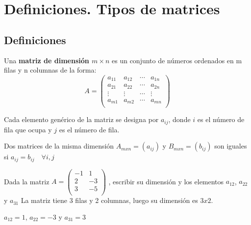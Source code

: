 \begin{indice}
\minitoc
\end{indice}

\newpage 

\section{Definiciones. Tipos de matrices}

\subsection{Definiciones}


\begin{definicion}
Una {\bf matriz de dimensión $m \times n$}  es un conjunto de números ordenados en m filas y n columnas de la forma:
 \[ A=\begin{pmatrix} 
 a_{11} & a_{12} & \cdots & a_{1n} \\
 a_{21} & a_{22} & \cdots & a_{2n} \\
  \vdots  & \vdots  & \cdots & \vdots \\
 a_{m1} & a_{m2} & \cdots & a_{mn} \\
\end{pmatrix}
\]
\end{definicion}

Cada elemento genérico de la matriz se designa por $a_{ij}$, donde $i$ es el número de fila que ocupa y $j$ es el número de fila.

\begin{definicion}[Igualdad]
Dos matrices de la misma dimensión $A_{mxn}=(a_{ij})$ y $B_{mxn}=(b_{ij})$ son iguales si $a_{ij}=b_{ij}\quad \forall i,j$
\end{definicion}

\begin{ejemplo}
Dada la matriz
$A= \begin{pmatrix}  -1 & 1  \\  2 & -3 \\  3 & -5 \\ \end{pmatrix}$ , escribir su dimensión y los elementos $a_{12}$, $a_{22}$ y $a_{31}$
\tcblower
La matriz tiene 3 filas y  2 columnas, luego su dimensión es $3x2$.

$a_{12} = 1$, $a_{22}= -3$ y $a_{31}=3$
\end{ejemplo}

